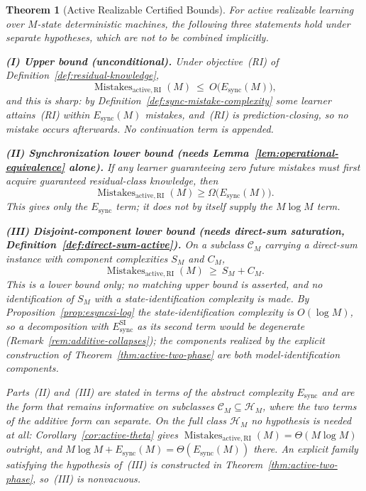 \documentclass[12pt]{article}
\newtheorem{theorem}{Theorem}[section]
\theoremstyle{definition}
\newcommand{\Esync}{E_{\mathrm{sync}}}
\newcommand{\EsyncSI}{E_{\mathrm{sync}}^{\mathrm{SI}}}
\newcommand{\MistRI}{\operatorname{Mistakes}_{\mathrm{active,RI}}}
\begin{document}
\begin{theorem}[Active Realizable Certified Bounds]
\label{thm:active-certified}
For active realizable learning over $M$-state deterministic machines, the
following three statements hold under \emph{separate} hypotheses, which are
not to be combined implicitly.

\medskip
\noindent\textbf{(I) Upper bound (unconditional).}
Under objective~(RI) of Definition~\ref{def:residual-knowledge},
\[
\MistRI(M)
\ \le\
O\bigl(\Esync(M)\bigr),
\]
and this is sharp: by Definition~\ref{def:sync-mistake-complexity} some
learner attains~(RI) within $\Esync(M)$ mistakes, and~(RI) is
prediction-closing, so no mistake occurs afterwards.  No continuation term is
appended.

\noindent\textbf{(II) Synchronization lower bound (needs
Lemma~\ref{lem:operational-equivalence} alone).}
If any learner guaranteeing zero future mistakes must first acquire
guaranteed residual-class knowledge, then
\[
\MistRI(M)
\ge
\Omega\bigl(\Esync(M)\bigr).
\]
This gives \emph{only} the $\Esync$ term; it does not by itself supply the
$M\log M$ term.

\noindent\textbf{(III) Disjoint-component lower bound (needs direct-sum
saturation, Definition~\ref{def:direct-sum-active}).}
On a subclass $\mathcal C_M$ carrying a direct-sum instance with component
complexities $S_M$ and $C_M$,
\[
\MistRI(M)\ \ge\ S_M+C_M .
\]
This is a lower bound only; no matching upper bound is asserted, and no
identification of $S_M$ with a state-identification complexity is made.  By
Proposition~\ref{prop:esyncsi-log} the state-identification complexity is
$O(\log M)$, so a decomposition with $\EsyncSI$ as its second term would be
degenerate (Remark~\ref{rem:additive-collapses}); the components realized by
the explicit construction of Theorem~\ref{thm:active-two-phase} are both
model-identification components.

\medskip
Parts~(II) and~(III) are stated in terms of the abstract complexity $\Esync$
and are the form that remains informative on \emph{subclasses}
$\mathcal C_M\subseteq\mathcal H_M$, where the two terms of the additive form
can separate.  On the full class $\mathcal H_M$ no hypothesis is needed at all:
Corollary~\ref{cor:active-theta} gives
$\MistRI(M)=\Theta(M\log M)$ outright, and
$M\log M+\Esync(M)=\Theta(\Esync(M))$ there.  An explicit family satisfying the
hypothesis of~(III) is constructed in
Theorem~\ref{thm:active-two-phase}, so~(III) is nonvacuous.
\end{theorem}
\end{document}
